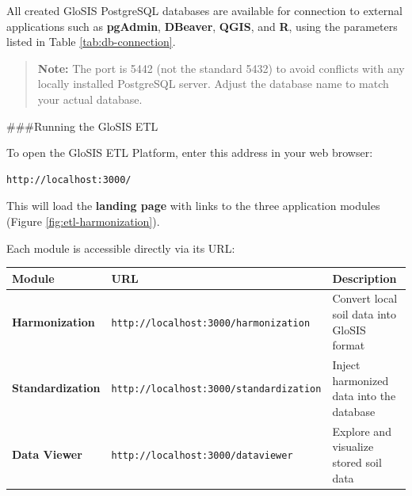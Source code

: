 \documentclass[
  10pt,
  b5paper,
  oneside]{book}
\begin{document}
All created GloSIS PostgreSQL databases are available for connection to external applications such as \textbf{pgAdmin}, \textbf{DBeaver}, \textbf{QGIS}, and \textbf{R}, using the parameters listed in Table \ref{tab:db-connection}.

\begin{quote}
\textbf{Note:} The port is 5442 (not the standard 5432) to avoid conflicts with any locally installed PostgreSQL server. Adjust the database name to match your actual database.
\end{quote}

\#\#\#Running the GloSIS ETL

To open the GloSIS ETL Platform, enter this address in your web browser:

\begin{verbatim}
http://localhost:3000/
\end{verbatim}

This will load the \textbf{landing page} with links to the three application modules (Figure \ref{fig:etl-harmonization}).

Each module is accessible directly via its URL:

\begin{longtable}[]{@{}
  >{\raggedright\arraybackslash}p{}
  >{\raggedright\arraybackslash}p{}
  >{\raggedright\arraybackslash}p{}@{}}
\toprule\noalign{}
\begin{minipage}[b]{\linewidth}\raggedright
Module
\end{minipage} & \begin{minipage}[b]{\linewidth}\raggedright
URL
\end{minipage} & \begin{minipage}[b]{\linewidth}\raggedright
Description
\end{minipage} \\
\midrule\noalign{}
\endhead
\bottomrule\noalign{}
\endlastfoot
\textbf{Harmonization} & \texttt{http://localhost:3000/harmonization} & Convert local soil data into GloSIS format \\
\textbf{Standardization} & \texttt{http://localhost:3000/standardization} & Inject harmonized data into the database \\
\textbf{Data Viewer} & \texttt{http://localhost:3000/dataviewer} & Explore and visualize stored soil data \\
\end{longtable}
\end{document}

